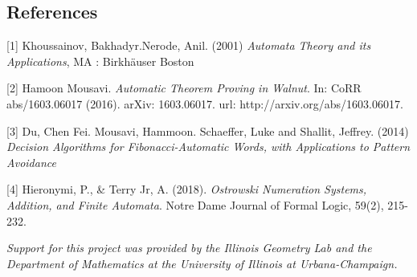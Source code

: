 \documentclass[landscape,usenames,dvipsnames]{sciposter}
\begin{document}
\begin{multicols}{3}
\section*{References}

{\footnotesize [1] Khoussainov, Bakhadyr.Nerode, Anil. (2001) \emph{Automata Theory and its Applications}, MA : Birkh\"auser Boston
}

{\footnotesize [2] Hamoon Mousavi. \emph{Automatic Theorem Proving in Walnut}. In: CoRR abs/1603.06017 (2016).
arXiv: 1603.06017. url: http://arxiv.org/abs/1603.06017.
}

{\footnotesize [3] Du, Chen Fei. Mousavi, Hammoon. Schaeffer, Luke and Shallit, Jeffrey. (2014) \emph{Decision Algorithms for Fibonacci-Automatic Words, with Applications to Pattern Avoidance}
}

{\footnotesize [4] Hieronymi, P., \& Terry Jr, A. (2018). \emph{Ostrowski Numeration Systems, Addition, and Finite Automata}. Notre Dame Journal of Formal Logic, 59(2), 215-232.
}

\vspace*{10mm} %
\emph{
Support for this project was provided by the Illinois Geometry Lab and the Department of Mathematics at the University of Illinois at Urbana-Champaign.
}
\end{multicols}
\end{document}
